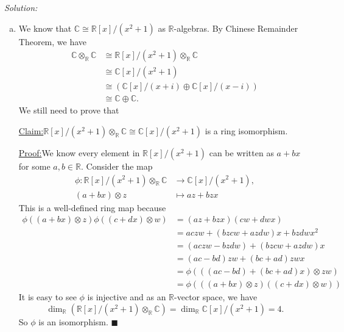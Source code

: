 \documentclass[a4paper, 12pt]{article}
\newenvironment{solution}
    {\textit{Solution:}}
    {}
\newenvironment{claim}[1]{\par\noindent\underline{Claim:}\space#1}{}
\newenvironment{claimproof}[1]{\par\noindent\underline{Proof:}\space#1}{\hfill $\blacksquare$}
\begin{document}
\begin{solution}
\begin{enumerate}[(a)]
\item We know that \(\mathbb{C}\cong \mathbb{R}[x]/(x^2+1)\) as \(\mathbb{R}\)-algebras. By Chinese Remainder Theorem, we have
\begin{align*}
\mathbb{C}\otimes_\mathbb{R}\mathbb{C}&\cong \mathbb{R}[x]/(x^2+1)\otimes_\mathbb{R}\mathbb{C}\\ 
                                      &\cong \mathbb{C}[x]/(x^2+1)\\ 
                                      &\cong (\mathbb{C}[x]/(x+i)\oplus \mathbb{C}[x]/(x-i))\\ 
                                      &\cong \mathbb{C}\oplus \mathbb{C}.
\end{align*}
We still need to prove that 
\begin{claim}
\(\mathbb{R}[x]/(x^2+1)\otimes_\mathbb{R}\mathbb{C}\cong \mathbb{C}[x]/(x^2+1)\) is a ring isomorphism. 
\end{claim}
\begin{claimproof}
We know every element in \(\mathbb{R}[x]/(x^2+1)\) can be written as \(a+bx\) for some \(a,b\in \mathbb{R}\). Consider the map 
\begin{align*}
    \phi:\mathbb{R}[x]/(x^2+1)\otimes_\mathbb{R}\mathbb{C}&\rightarrow \mathbb{C}[x]/(x^2+1),\\ 
    (a+bx)\otimes z&\mapsto az+bzx
\end{align*}
This is a well-defined ring map because 
\begin{align*}
\phi((a+bx)\otimes z)\phi((c+dx)\otimes w)&=(az+bzx)(cw+dwx)\\ 
                                          &=aczw+(bzcw+azdw)x+bzdwx^2\\ 
                                          &=(aczw-bzdw)+(bzcw+azdw)x\\ 
                                          &=(ac-bd)zw+(bc+ad)zwx\\ 
                                          &=\phi(((ac-bd)+(bc+ad)x)\otimes zw)\\ 
                                          &=\phi(((a+bx)\otimes z)((c+dx)\otimes w))
\end{align*}
It is easy to see \(\phi\) is injective and as an \(\mathbb{R}\)-vector space, we have 
\[\dim_\mathbb{R}(\mathbb{R}[x]/(x^2+1)\otimes_\mathbb{R}\mathbb{C})=\dim_\mathbb{R}\mathbb{C}[x]/(x^2+1)=4.\]
So \(\phi\) is an isomorphism.
\end{claimproof}


\end{enumerate}
\end{solution}
\end{document}
